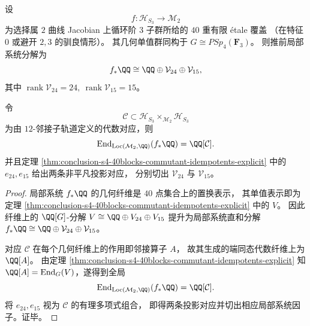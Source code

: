 \begin{theorem}\label{thm:conclusion-s4-etalecover-pushforward-local-system-decomposition-correspondence}
设
\[
f:\mathcal H_{S_3}\longrightarrow \mathcal M_2
\]
为选择属 \(2\) 曲线 Jacobian 上循环阶 \(3\) 子群所给的 \(40\) 重有限 étale 覆盖
（在特征 \(0\) 或避开 \(2,3\) 的驯良情形）。
其几何单值群同构于 \(G\cong PSp_4(\mathbf F_3)\)。
则推前局部系统分解为
\[
f_*\QQ\cong \QQ\oplus \mathcal V_{24}\oplus \mathcal V_{15},
\]
其中 \(\operatorname{rank}\mathcal V_{24}=24,\ \operatorname{rank}\mathcal V_{15}=15\)。

令
\[
\mathcal C\subset \mathcal H_{S_3}\times_{\mathcal M_2}\mathcal H_{S_3}
\]
为由 \(12\)-邻接子轨道定义的代数对应，则
\[
\operatorname{End}_{\mathrm{Loc}(\mathcal M_2,\QQ)}(f_*\QQ)=\QQ[\mathcal C].
\]
并且定理 \ref{thm:conclusion-s4-40blocks-commutant-idempotents-explicit}
中的 \(e_{24},e_{15}\) 给出两条非平凡投影对应，
分别切出 \(\mathcal V_{24}\) 与 \(\mathcal V_{15}\)。
\end{theorem}
\begin{proof}
局部系统 \(f_*\QQ\) 的几何纤维是 \(40\) 点集合上的置换表示，
其单值表示即为定理
\ref{thm:conclusion-s4-40blocks-commutant-idempotents-explicit}
中的 \(V\)。
因此纤维上的 \(\QQ[G]\)-分解
\(
V\cong \QQ\oplus V_{24}\oplus V_{15}
\)
提升为局部系统直和分解
\(
f_*\QQ\cong \QQ\oplus \mathcal V_{24}\oplus \mathcal V_{15}
\)。

对应 \(\mathcal C\) 在每个几何纤维上的作用即邻接算子 \(A\)，
故其生成的端同态代数纤维上为 \(\QQ[A]\)。
由定理
\ref{thm:conclusion-s4-40blocks-commutant-idempotents-explicit}
知 \(\QQ[A]=\operatorname{End}_G(V)\)，遂得到全局
\[
\operatorname{End}_{\mathrm{Loc}(\mathcal M_2,\QQ)}(f_*\QQ)=\QQ[\mathcal C].
\]
将 \(e_{24},e_{15}\) 视为 \(\mathcal C\) 的有理多项式组合，
即得两条投影对应并切出相应局部系统因子。证毕。
\end{proof}



